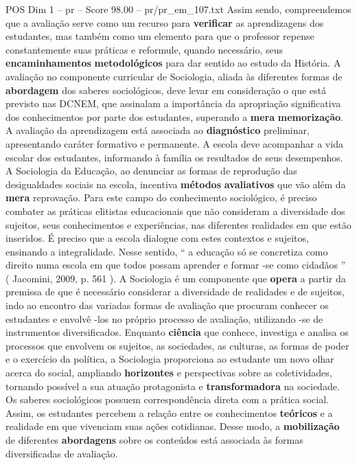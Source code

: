 \begin{textsample}{POS Dim 1 – pr – Score 98.00 – pr/pr\_em\_107.txt}
Assim sendo, compreendemos que a avaliação serve como um recurso para \textbf{verificar} as aprendizagens dos estudantes, mas também como um elemento para que o professor repense constantemente suas práticas e reformule, quando necessário, seus \textbf{encaminhamentos} \textbf{metodológicos} para dar sentido ao estudo da História.
A avaliação no componente curricular de Sociologia, aliada às diferentes formas de \textbf{abordagem} dos saberes sociológicos, deve levar em consideração o que está previsto nas DCNEM, que assinalam a importância da apropriação significativa dos conhecimentos por parte dos estudantes, superando a \textbf{mera} \textbf{memorização}.
A avaliação da aprendizagem está associada ao \textbf{diagnóstico} preliminar, apresentando caráter formativo e permanente.
A escola deve acompanhar a vida escolar dos estudantes, informando à família os resultados de seus desempenhos.
A Sociologia da Educação, ao denunciar as formas de reprodução das desigualdades sociais na escola, incentiva \textbf{métodos} \textbf{avaliativos} que vão além da \textbf{mera} reprovação.
Para este campo do conhecimento sociológico, é preciso combater as práticas elitistas educacionais que não consideram a diversidade dos sujeitos, seus conhecimentos e experiências, nas diferentes realidades em que estão inseridos.
É preciso que a escola dialogue com estes contextos e sujeitos, ensinando a integralidade.
Nesse sentido, “ a educação só se concretiza como direito numa escola em que todos possam aprender e formar -se como cidadãos ” ( Jacomini, 2009, p. 561 ).
A Sociologia é um componente que \textbf{opera} a partir da premissa de que é necessário considerar a diversidade de realidades e de sujeitos, indo ao encontro das variadas formas de avaliação que procuram conhecer os estudantes e envolvê -los no próprio processo de avaliação, utilizando -se de instrumentos diversificados.
Enquanto \textbf{ciência} que conhece, investiga e analisa os processos que envolvem os sujeitos, as sociedades, as culturas, as formas de poder e o exercício da política, a Sociologia proporciona ao estudante um novo olhar acerca do social, ampliando \textbf{horizontes} e perspectivas sobre as coletividades, tornando possível a sua atuação protagonista e \textbf{transformadora} na sociedade.
Os saberes sociológicos possuem correspondência direta com a prática social.
Assim, os estudantes percebem a relação entre os conhecimentos \textbf{teóricos} e a realidade em que vivenciam suas ações cotidianas.
Desse modo, a \textbf{mobilização} de diferentes \textbf{abordagens} sobre os conteúdos está associada às formas diversificadas de avaliação.

\end{textsample}
